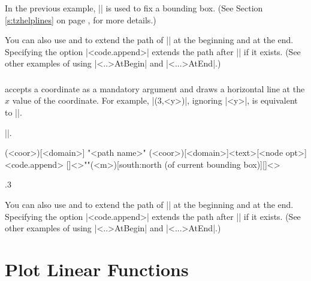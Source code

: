 In the previous example, |\tzhelplines*| is used to fix a bounding box. (See Section \ref{s:tzhelplines} on page \pageref{s:tzhelplines}, for more details.)

You can also use \icmd{\tzvfnatAtBegin} and \icmd{\tzvfnatAtEnd} to extend the path of |\tzvfnat| at the beginning and at the end. Specifying the option |<code.append>| extends the path after |\tzvfnatAtEnd| if it exists.
(See other examples of using |\tz<..>AtBegin| and |\tz<...>AtEnd|.)

\subsection{\protect\cmd{\tzvfn}}
\label{ss:tzvfn}

\icmd{\tzvfn} accepts a coordinate as a mandatory argument and draws a horizontal line at the $x$ value of the coordinate.
For example, |\tzvfn(3,<y>)|, ignoring |<y>|, is equivalent to ||.

 |\tzvfnat|.

\begin{tzdef}{}
\tzvfn(<coor>)[<domain>]
"<path name>"
      (<coor>)[<domain>]{<text>}[<node opt>]<code.append>
  []<>""(<m>)[south:north (of current bounding box)]{}[]<>
\end{tzdef}

\begin{tzcode}{.3}
\end{tzcode}

You can also use \icmd{\tzvfnAtBegin} and \icmd{\tzvfnAtEnd} to extend the path of |\tzvfn| at the beginning and at the end. Specifying the option |<code.append>| extends the path after |\tzvfnAtEnd| if it exists.
(See other examples of using |\tz<..>AtBegin| and |\tz<...>AtEnd|.)





\chapter{Plot Linear Functions}
\label{c:linearfunctions}


